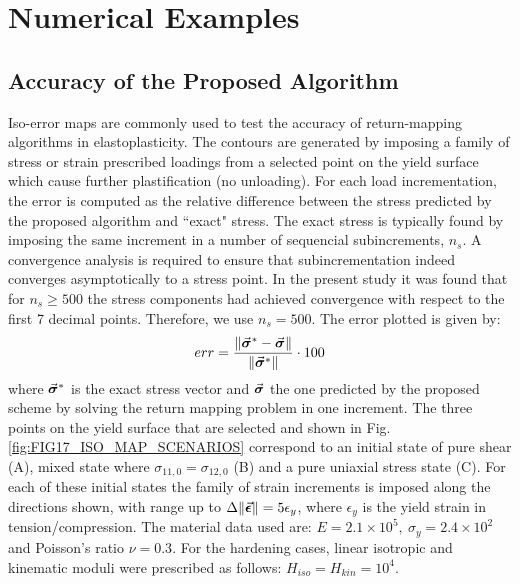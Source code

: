 \section{Numerical Examples}\label{section:CH3-S5}

\subsection{Accuracy of the Proposed Algorithm}    %

Iso-error maps are commonly used to test the accuracy of return-mapping 
algorithms in elastoplasticity\cite{DeSouza2011}. The contours are generated by 
imposing a family of stress or strain prescribed loadings from a selected point 
on the yield surface which cause further plastification (no unloading). For 
each load incrementation, the error is computed as the relative difference 
between the stress predicted by the proposed algorithm and ``exact" stress. 
The exact stress is typically found by imposing the same increment in a number 
of sequencial subincrements, $n_s$. A convergence analysis is required to 
ensure that subincrementation indeed converges asymptotically to a stress 
point. In the 
present study it was found that for $n_s\geq 500$ the stress components had 
achieved convergence with respect to the first 7 decimal points. Therefore, we 
use $n_s = 500$. The error plotted is given by:
\begin{equation}
	err = \frac{\Vert 
		\vec{\bm{\sigma}}^*-\vec{\bm{\sigma}}\Vert}{\Vert\vec{\bm{\sigma}}^*\Vert}\cdot 100
	\label{eq:ERROR}
\end{equation}
\noindent where $\vec{\bm{\sigma}}^*$ is the exact stress vector and 
$\vec{\bm{\sigma}}$ the one predicted by the proposed scheme by solving the return 
mapping problem in one 
increment. The three points on the yield surface that are selected and shown
in Fig. \ref{fig:FIG17_ISO_MAP_SCENARIOS} correspond to an initial state of 
pure shear (A), mixed 
state where $\sigma_{11,0}=\sigma_{12,0}$ (B) and a pure uniaxial stress state 
(C). 
For each of these initial states the family of strain increments is imposed 
along the directions shown, with range up to 
$\Delta\Vert\vec{\bm{\epsilon}}\Vert=5\epsilon_y$, where $\epsilon_y$ is the yield 
strain in tension/compression. The material data used are: $E=2.1\times 10^5,\ 
\sigma_y = 2.4\times 10^2$ and Poisson's ratio $\nu=0.3$. For the hardening 
cases, linear isotropic and 
kinematic moduli were prescribed as follows: $H_{iso}=H_{kin} = 10^4$.

